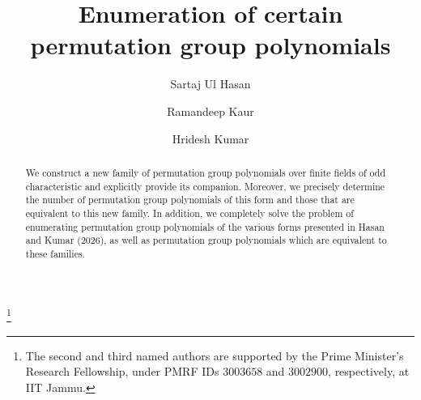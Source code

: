 \documentclass[11pt]{amsart}
\theoremstyle{plain}
\numberwithin{equation}{section}
\begin{document}
\title[Enumeration of certain permutation group polynomials]{Enumeration of certain  permutation group polynomials}
 \author[S. U. Hasan]{Sartaj Ul Hasan}
 \address{Department of Mathematics, Indian Institute of Technology Jammu, Jammu 181221, India}
  
  \author[R. Kaur]{Ramandeep Kaur}
  \address{Department of Mathematics, Indian Institute of Technology Jammu, Jammu 181221, India}
  \author[H. Kumar]{Hridesh Kumar}
\address{Department of Mathematics, Indian Institute of Technology Jammu, Jammu 181221, India}
 \thanks{%
 The second and third named authors are supported by the Prime Minister’s Research Fellowship, under PMRF IDs $3003658$ and $3002900$, respectively, at IIT Jammu.}
\begin{abstract}
We construct a new family of permutation group polynomials over finite fields of odd characteristic and explicitly provide its companion. Moreover, we precisely determine the number of permutation group polynomials of this form and those that are equivalent to this new family.
In addition, we completely solve the problem of enumerating permutation group polynomials of the various forms presented in Hasan and Kumar (2026), as well as permutation group polynomials which are equivalent to these families.
 \end{abstract}
\maketitle
\end{document}

